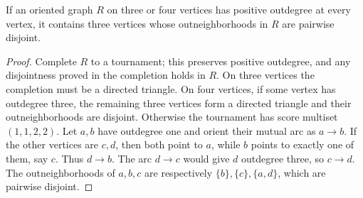 \begin{lemma}\label{lem:odd-root-three-disjoint}
If an oriented graph $R$ on three or four vertices has positive
outdegree at every vertex, it contains three vertices whose
outneighborhoods in $R$ are pairwise disjoint.
\end{lemma}
\begin{proof}
Complete $R$ to a tournament; this preserves positive outdegree,
and any disjointness proved in the completion holds in $R$.
On three vertices the completion must be a directed triangle.
On four vertices, if some vertex has outdegree three, the remaining
three vertices form a directed triangle and their outneighborhoods
are disjoint.  Otherwise the tournament has score multiset
$(1,1,2,2)$.  Let $a,b$ have outdegree one and orient their mutual
arc as $a\to b$.  If the other vertices are $c,d$, then both point
to $a$, while $b$ points to exactly one of them, say $c$.  Thus
$d\to b$.  The arc $d\to c$ would give $d$ outdegree three, so
$c\to d$.  The outneighborhoods of $a,b,c$ are respectively
$\{b\},\{c\},\{a,d\}$, which are pairwise disjoint.
\end{proof}
